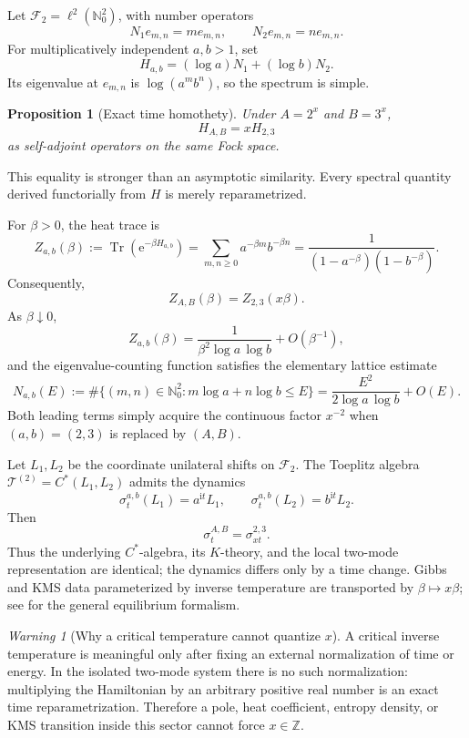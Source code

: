 \documentclass[11pt,oneside]{article}
\newtheorem{proposition}[theorem]{Proposition}
\theoremstyle{definition}
\theoremstyle{remark}
\newtheorem{warning}[theorem]{Warning}
\newcommand{\Nzero}{\mathbb N_0}
\newcommand{\Z}{\mathbb Z}
\newcommand{\Tr}{\operatorname{Tr}}
\newcommand{\ee}{\mathrm e}
\newcommand{\ii}{\mathrm i}
\newcommand{\cF}{\mathcal F}
\newcommand{\cT}{\mathcal T}
\begin{document}
Let \(\cF_2=\ell^2(\Nzero^2)\), with number operators
\[
        N_1e_{m,n}=m e_{m,n},\qquad
        N_2e_{m,n}=n e_{m,n}.
\]
For multiplicatively independent \(a,b>1\), set
\[
        H_{a,b}=(\log a)N_1+(\log b)N_2.
\]
Its eigenvalue at \(e_{m,n}\) is
\(\log(a^mb^n)\), so the spectrum is simple.

\begin{proposition}[Exact time homothety]\label{prop:fock-homothety}
Under \(A=2^x\) and \(B=3^x\),
\[
        H_{A,B}=xH_{2,3}
\]
as self-adjoint operators on the same Fock space.
\end{proposition}

This equality is stronger than an asymptotic similarity.  Every spectral
quantity derived functorially from \(H\) is merely reparametrized.

For \(\beta>0\), the heat trace is
\begin{equation}\label{eq:partition}
 Z_{a,b}(\beta)
 :=\Tr(\ee^{-\beta H_{a,b}})
 =\sum_{m,n\geq0}a^{-\beta m}b^{-\beta n}
 =\frac{1}{(1-a^{-\beta})(1-b^{-\beta})}.
\end{equation}
Consequently,
\[
        Z_{A,B}(\beta)=Z_{2,3}(x\beta).
\]
As \(\beta\downarrow0\),
\begin{equation}\label{eq:heat-asymp}
        Z_{a,b}(\beta)
        =\frac{1}{\beta^2\log a\,\log b}
         +O(\beta^{-1}),
\end{equation}
and the eigenvalue-counting function satisfies the elementary lattice
estimate
\begin{equation}\label{eq:weyl}
 N_{a,b}(E)
 :=\#\{(m,n)\in\Nzero^2:m\log a+n\log b\leq E\}
 =\frac{E^2}{2\log a\,\log b}+O(E).
\end{equation}
Both leading terms simply acquire the continuous factor \(x^{-2}\) when
\((a,b)=(2,3)\) is replaced by \((A,B)\).

Let \(L_1,L_2\) be the coordinate unilateral shifts on \(\cF_2\).
The Toeplitz algebra \(\cT^{(2)}=C^*(L_1,L_2)\) admits the dynamics
\[
        \sigma_t^{a,b}(L_1)=a^{\ii t}L_1,\qquad
        \sigma_t^{a,b}(L_2)=b^{\ii t}L_2.
\]
Then
\[
        \sigma_t^{A,B}=\sigma_{xt}^{2,3}.
\]
Thus the underlying \(C^*\)-algebra, its \(K\)-theory, and the local
two-mode representation are identical; the dynamics differs only by a
time change.  Gibbs and KMS data parameterized by inverse temperature
are transported by \(\beta\mapsto x\beta\); see
\cite{BratteliRobinson,BostConnes} for the general equilibrium formalism.

\begin{warning}[Why a critical temperature cannot quantize \(x\)]
A critical inverse temperature is meaningful only after fixing an
external normalization of time or energy.  In the isolated two-mode
system there is no such normalization: multiplying the Hamiltonian by
an arbitrary positive real number is an exact time reparametrization.
Therefore a pole, heat coefficient, entropy density, or KMS transition
inside this sector cannot force \(x\in\Z\).
\end{warning}
\end{document}
